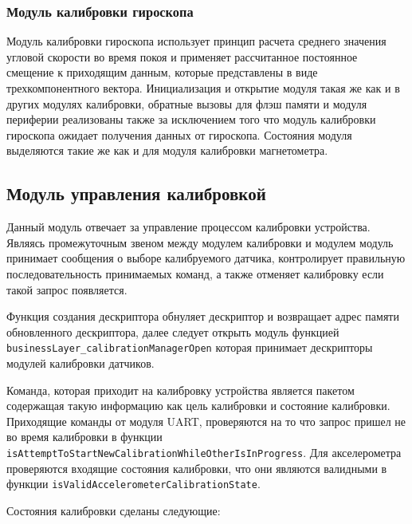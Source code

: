 \subsubsection{Модуль калибровки гироскопа}

Модуль калибровки гироскопа использует принцип расчета среднего значения угловой скорости во время покоя и применяет
рассчитанное постоянное смещение к приходящим данным, которые представлены в виде трехкомпонентного вектора.
Инициализация и открытие модуля такая же как и в других модулях калибровки,
обратные вызовы для флэш памяти и модуля периферии реализованы также за исключением того что модуль калибровки гироскопа ожидает получения данных от гироскопа.
Состояния модуля выделяются такие же как и для модуля калибровки магнетометра.

\subsection{Модуль управления калибровкой}

Данный модуль отвечает за управление процессом калибровки устройства. Являясь промежуточным звеном между модулем калибровки и модулем \moduleUart
модуль принимает сообщения о выборе калибруемого датчика, контролирует правильную последовательность принимаемых команд, а также отменяет
калибровку если такой запрос появляется.

Функция создания дескриптора обнуляет дескриптор и возвращает адрес памяти обновленного дескриптора, далее следует открыть модуль функцией
\lstinline{businessLayer_calibrationManagerOpen} которая принимает дескрипторы модулей калибровки датчиков.

Команда, которая приходит на калибровку устройства является пакетом содержащая такую информацию как цель калибровки и состояние калибровки.
Приходящие команды от модуля UART, проверяются на то что запрос пришел не во время калибровки в функции \lstinline{isAttemptToStartNewCalibrationWhileOtherIsInProgress}.
Для акселерометра проверяются входящие состояния калибровки, что они являются валидными в функции \lstinline{isValidAccelerometerCalibrationState}.

Состояния калибровки сделаны следующие:

